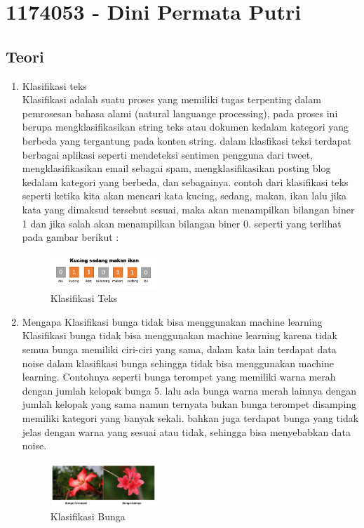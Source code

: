 \section{1174053 - Dini Permata Putri}

\subsection{Teori}
\begin{enumerate}
\item Klasifikasi teks\\
Klasifikasi adalah suatu proses yang memiliki tugas terpenting dalam pemrosesan bahasa alami (natural languange processing), pada proses ini berupa mengklasifikasikan string teks atau dokumen kedalam kategori yang berbeda yang tergantung pada konten string. dalam klasfikasi teksi terdapat berbagai aplikasi seperti mendeteksi sentimen pengguna dari tweet, mengklasifikasikan email sebagai spam, mengklasifikasikan posting blog kedalam kategori yang berbeda, dan sebagainya. contoh dari klasifikasi teks seperti ketika kita akan mencari kata kucing, sedang, makan, ikan lalu jika kata yang dimaksud tersebut sesuai, maka akan menampilkan bilangan biner 1 dan jika salah akan menampilkan bilangan biner 0. seperti yang terlihat pada gambar berikut :
\hfill\break
	\begin{figure}[H]
		\includegraphics[width=4cm]{figures/1174053/4/1.png}
		\centering
		\caption{Klasifikasi Teks}
	\end{figure}

\item Mengapa Klasifikasi bunga tidak bisa menggunakan machine learning\\
Klasifikasi bunga tidak bisa menggunakan machine learning karena tidak semua bunga memiliki ciri-ciri yang sama, dalam kata lain terdapat data noise dalam klasifikasi bunga sehingga tidak bisa menggunakan machine learning. Contohnya seperti bunga terompet yang memiliki warna merah dengan jumlah kelopak bunga 5. lalu ada bunga warna merah lainnya dengan jumlah kelopak yang sama namun ternyata bukan bunga terompet disamping memiliki kategori yang banyak sekali. bahkan juga terdapat bunga yang tidak jelas dengan warna yang sesuai atau tidak, sehingga bisa menyebabkan data noise.
\hfill\break
	\begin{figure}[H]
		\includegraphics[width=4cm]{figures/1174053/4/2.png}
		\centering
		\caption{Klasifikasi Bunga}
	\end{figure}


\end{enumerate}
